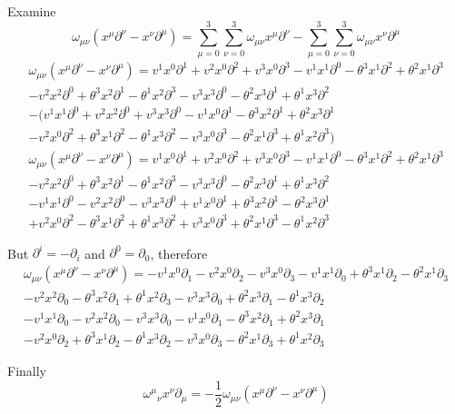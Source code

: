 \documentclass{article}
\begin{document}
Examine \[\omega_{\mu\nu} (x^\mu \partial^\nu-x^\nu \partial^\mu)=\sum^3_{\mu=0}\sum^3_{\nu=0}\omega_{\mu\nu} x^\mu \partial^\nu-\sum^3_{\mu=0}\sum^3_{\nu=0}\omega_{\mu\nu} x^\nu \partial^\mu\]
\begin{multline*}
\omega_{\mu\nu} (x^\mu \partial^\nu-x^\nu \partial^\mu)=
v^1 x^0 \partial^1+v^2 x^0 \partial^2+v^3 x^0 \partial^3
-v^1 x^1 \partial^0-\theta^3 x^1 \partial^2+\theta^2 x^1 \partial^3\\ 
-v^2 x^2 \partial^0+\theta^3 x^2 \partial^1-\theta^1 x^2 \partial^3
-v^3 x^3 \partial^0-\theta^2 x^3 \partial^1+\theta^1 x^3 \partial^2\\-
(v^1 x^1 \partial^0+v^2 x^2 \partial^0+v^3 x^3 \partial^0
-v^1 x^0 \partial^1-\theta^3 x^2 \partial^1+\theta^2 x^3 \partial^1\\ 
-v^2 x^0 \partial^2+\theta^3 x^1 \partial^2-\theta^1 x^3 \partial^2
-v^3 x^0 \partial^3-\theta^2 x^1 \partial^3+\theta^1 x^2 \partial^3)\end{multline*}
\begin{multline*}
\omega_{\mu\nu} (x^\mu \partial^\nu-x^\nu \partial^\mu)=
v^1 x^0 \partial^1+v^2 x^0 \partial^2+v^3 x^0 \partial^3
-v^1 x^1 \partial^0-\theta^3 x^1 \partial^2+\theta^2 x^1 \partial^3\\ 
-v^2 x^2 \partial^0+\theta^3 x^2 \partial^1-\theta^1 x^2 \partial^3
-v^3 x^3 \partial^0-\theta^2 x^3 \partial^1+\theta^1 x^3 \partial^2\\
-v^1 x^1 \partial^0-v^2 x^2 \partial^0-v^3 x^3 \partial^0
+v^1 x^0 \partial^1+\theta^3 x^2 \partial^1-\theta^2 x^3 \partial^1\\ 
+v^2 x^0 \partial^2-\theta^3 x^1 \partial^2+\theta^1 x^3 \partial^2
+v^3 x^0 \partial^3+\theta^2 x^1 \partial^3-\theta^1 x^2 \partial^3\end{multline*}

But $\partial^i=-\partial_i$ and $\partial^0=\partial_0$, therefore
\begin{multline*}
\omega_{\mu\nu} (x^\mu \partial^\nu-x^\nu \partial^\mu)=
-v^1 x^0 \partial_1-v^2 x^0 \partial_2-v^3 x^0 \partial_3
-v^1 x^1 \partial_0+\theta^3 x^1 \partial_2-\theta^2 x^1 \partial_3\\ 
-v^2 x^2 \partial_0-\theta^3 x^2 \partial_1+\theta^1 x^2 \partial_3
-v^3 x^3 \partial_0+\theta^2 x^3 \partial_1-\theta^1 x^3 \partial_2\\
-v^1 x^1 \partial_0-v^2 x^2 \partial_0-v^3 x^3 \partial_0
-v^1 x^0 \partial_1-\theta^3 x^2 \partial_1+\theta^2 x^3 \partial_1\\ 
-v^2 x^0 \partial_2+\theta^3 x^1 \partial_2-\theta^1 x^3 \partial_2
-v^3 x^0 \partial_3-\theta^2 x^1 \partial_3+\theta^1 x^2 \partial_3\end{multline*}

Finally
\[{\omega^\mu}_\nu x^\nu \partial_\mu=-\frac{1}{2}\omega_{\mu\nu} (x^\mu \partial^\nu-x^\nu \partial^\mu)\]
\end{document}
